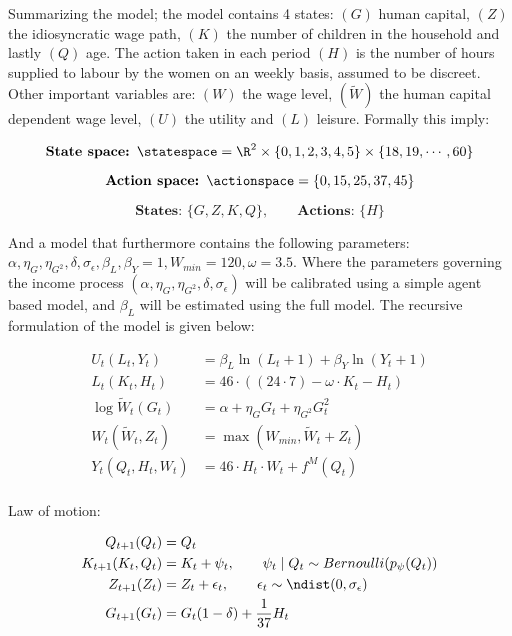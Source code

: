 Summarizing the model; the model contains 4 states: $(G)$ human capital, $(Z)$ the idiosyncratic wage path, $(K)$ the number of children in the household and lastly $(Q)$ age. The action taken in each period $(H)$ is the number of hours supplied to labour by the women on an weekly basis, assumed to be discreet. Other important variables are: $(W)$ the wage level, $(\tilde{W})$ the human capital dependent wage level,  $(U)$ the utility and $(L)$ leisure. Formally this imply:

\begin{equation}
    \textbf{State space: }\statespace = \R^{2} \times \{0, 1, 2, 3, 4, 5\} \times \{ 18, 19, \cdots, 60\}
\end{equation}

\begin{equation}
    \textbf{Action space: }\actionspace  = \{0, 15, 25, 37, 45\} 
\end{equation}

\begin{equation}
    \textbf{States: }\{G, Z, K, Q\}, \qquad \textbf{Actions: } \{H\} 
\end{equation}

And a model that furthermore contains the following parameters: $\alpha, \eta_G, \eta_{G^2}, \delta, \sigma_\epsilon, \beta_L, \beta_Y=1, W_{min}=120, \omega=3.5$. Where the parameters governing the income process $(\alpha, \eta_G, \eta_{G^2}, \delta, \sigma_\epsilon)$ will be calibrated using a simple agent based model, and $\beta_L$ will be estimated using the full model. The recursive formulation of the model is given below:

\begin{align}
    U_t(L_t, Y_t) &= \beta_L \ln(L_t + 1) + \beta_Y \ln(Y_t + 1) \label{eq:utility_v1}\\
    L_t(K_t, H_t) &= 46 \cdot ((24 \cdot 7) - \omega \cdot K_t  - H_t) \label{eq:leissure_v1}\\
    \log \tilde{W}_t (G_t) &= \alpha + \eta_G G_t + \eta_{G^2} G_t^2 \label{eq:salary_tilde_v1}\\
    W_t(\tilde{W}_t, Z_t) &= \max(W_{min} , \tilde{W}_t  + Z_t)  \label{eq:salary_v1}\\
    Y_t(Q_t,H_t, W_t) &= 46 \cdot H_t \cdot W_t + f^M(Q_t) \label{eq:total_salary_v1}\\
\end{align}

Law of motion:

\begin{align}
    Q_{t+1}(Q_t) &= Q_t \label{eq:age_v1}\\
    K_{t+1}(K_t, Q_t)  &= K_{t} + \psi_t, \qquad \psi_t \mid Q_t \sim Bernoulli(p_\psi(Q_t)) \label{eq:fertility_v1} \\
    Z_{t+1}(Z_t) &= Z_t + \epsilon_t, \qquad \epsilon_t \sim \ndist(0, \sigma_\epsilon) \label{eq:idiosyncratic_wage_path_v1}\\
    G_{t+1}(G_t) &= G_t(1 - \delta) + \frac{1}{37} H_t \\
\end{align}


